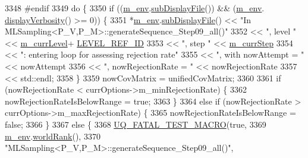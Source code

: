 \begin{DoxyCode}
3348 \textcolor{preprocessor}{#endif}
3349 \textcolor{preprocessor}{}      \textcolor{keywordflow}{do} \{
3350         \textcolor{keywordflow}{if} ((\hyperlink{class_q_u_e_s_o_1_1_m_l_sampling_a13f1ca4fe9f94822fe572a743eaced1d}{m\_env}.\hyperlink{class_q_u_e_s_o_1_1_base_environment_a8a0064746ae8dddfece4229b9ad374d6}{subDisplayFile}()) && (\hyperlink{class_q_u_e_s_o_1_1_m_l_sampling_a13f1ca4fe9f94822fe572a743eaced1d}{m\_env}.
      \hyperlink{class_q_u_e_s_o_1_1_base_environment_a1fe5f244fc0316a0ab3e37463f108b96}{displayVerbosity}() >= 0)) \{
3351           *\hyperlink{class_q_u_e_s_o_1_1_m_l_sampling_a13f1ca4fe9f94822fe572a743eaced1d}{m\_env}.\hyperlink{class_q_u_e_s_o_1_1_base_environment_a8a0064746ae8dddfece4229b9ad374d6}{subDisplayFile}() << \textcolor{stringliteral}{"In
       MLSampling<P\_V,P\_M>::generateSequence\_Step09\_all()"}
3352                                   << \textcolor{stringliteral}{", level "} << \hyperlink{class_q_u_e_s_o_1_1_m_l_sampling_af9416874c856e50f3b35270e801f17e4}{m\_currLevel}+
      \hyperlink{_m_l_sampling_level_options_8h_a68d15eaf394d210effcf584b938206d3}{LEVEL\_REF\_ID}
3353                                   << \textcolor{stringliteral}{", step "}  << \hyperlink{class_q_u_e_s_o_1_1_m_l_sampling_a1b1f8ccb4823bdfa26ec652f0807c63e}{m\_currStep}
3354                                   << \textcolor{stringliteral}{": entering loop for assessing rejection rate"}
3355                                   << \textcolor{stringliteral}{", with nowAttempt = "}  << nowAttempt
3356                                   << \textcolor{stringliteral}{", nowRejectionRate = "} << nowRejectionRate
3357                                   << std::endl;
3358         \}
3359         nowCovMatrix = unifiedCovMatrix;
3360 
3361         \textcolor{keywordflow}{if} (nowRejectionRate < currOptions->m\_minRejectionRate) \{
3362           nowRejectionRateIsBelowRange = \textcolor{keyword}{true};
3363         \}
3364         \textcolor{keywordflow}{else} \textcolor{keywordflow}{if} (nowRejectionRate > currOptions->m\_maxRejectionRate) \{
3365           nowRejectionRateIsBelowRange = \textcolor{keyword}{false};
3366         \}
3367         \textcolor{keywordflow}{else} \{
3368           \hyperlink{_defines_8h_a56d63d18d0a6d45757de47fcc06f574d}{UQ\_FATAL\_TEST\_MACRO}(\textcolor{keyword}{true},
3369                               \hyperlink{class_q_u_e_s_o_1_1_m_l_sampling_a13f1ca4fe9f94822fe572a743eaced1d}{m\_env}.\hyperlink{class_q_u_e_s_o_1_1_base_environment_a78b57112bbd0e6dd0e8afec00b40ffa7}{worldRank}(),
3370                               \textcolor{stringliteral}{"MLSampling<P\_V,P\_M>::generateSequence\_Step09\_all()"},

\end{DoxyCode}
